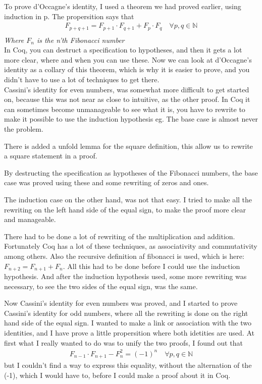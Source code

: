 \documentclass[a4paper,10p,danish]{article}
\begin{document}
To prove d'Occagne's identity, I used a theorem we had proved earlier, using induction in p. The propersition says that
\begin{align*}
F_{p+q+1} = F_{p+1} \cdot F_{q+1} + F_{p} \cdot F_{q} \quad \forall p,q \in \mathbb{N}\\
\end{align*}
\textit{Where $F_n$ is the n'th Fibonacci number}\\

In Coq, you can destruct a specification to hypotheses, and then it gets a lot more clear, where and when you can use these. 
Now we can look at d'Occagne's identity as a collary of this theorem, which is why it is easier to prove, and you didn't have to use a lot of techniques to get there.\\  

Cassini's identity for even numbers, was somewhat more difficult to get started on, because this was not near as close to intuitive, as the other proof. In Coq it can sometimes become unmanageable to see what it is, you have to rewrite to make it possible to use the induction hypothesis eg. The base case is almost never the problem. 

There is added a unfold lemma for the square definition, this allow us to rewrite a square statement in a proof.

By destructing the specification as hypotheses of the Fibonacci numbers, the base case was proved using these and some rewriting of zeros and ones.

The induction case on the other hand, was not that easy. I tried to make all the rewriting on the left hand side of the equal sign, to make the proof more clear and manageable. 

There had to be done a lot of rewriting of the multiplication and addition. Fortunately Coq has a lot of these techniques, as associativity and commutativity among others. Also the recursive definition af fibonacci is used, which is here: $F_{n+2} = F_{n+1} + F_{n}$. All this had to be done before I could use the induction hypothesis. And after the induction hypothesis used, some more rewriting was necessary, to see the two sides of the equal sign, was the same. 

Now Cassini's identity for even numbers was proved, and I started to prove Cassini's identity for odd numbers, where all the rewriting is done on the right hand side of the equal sign. I wanted to make a link or association with the two identities, and I have prove a little propersition where both idetities are used. At first what I really wanted to do was to unify the two proofs, I found out that 
\begin{align*}
F_{n-1} \cdot F_{n+1} - F_n^2 = (-1)^n \quad \forall p,q \in \mathbb{N}
\end{align*}
but I couldn't find a way to express this equality, without the alternation of the (-1), which I would have to, before I could make a proof about it in Coq. 
\end{document}

